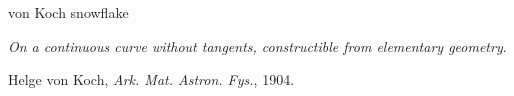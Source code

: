\documentclass[usenames, dvipsnames, aspectratio=169]{beamer}
\begin{document}
\begin{frame}[t, c]{von Koch snowflake}{}
  \vfill

  \begin{minipage}{.28\textwidth}
    \centering
  \end{minipage}%
  \hfill
  \begin{minipage}{.68\textwidth}
    \emph{On a continuous curve without tangents, constructible from elementary geometry}.
    \begin{flushright}
      Helge von Koch, \emph{Ark. Mat. Astron. Fys.}, 1904.
    \end{flushright}
  \end{minipage}

  \vfill
\end{frame}
\end{document}
